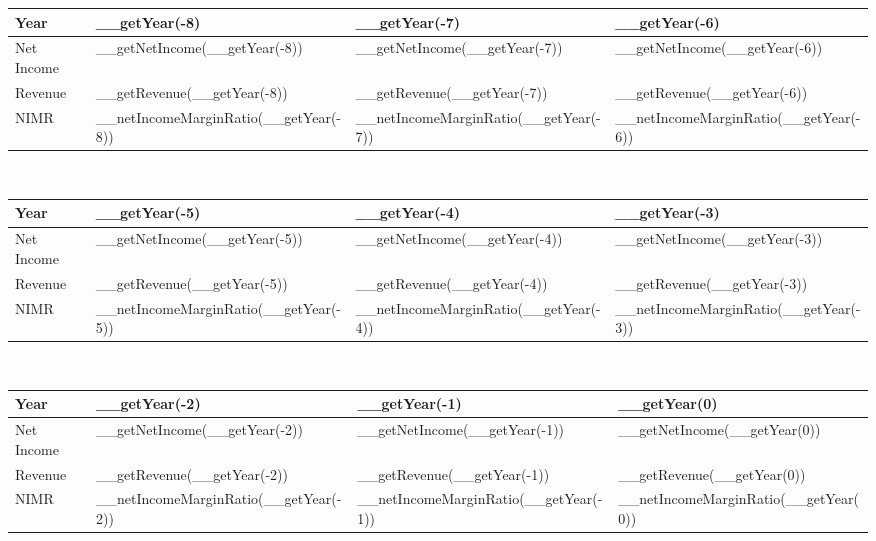 \begin{tabularx}{\textwidth}{|X|X|X|X|}
 \hline
 Year                       & __getYear(-8)                         & __getYear(-7)                         & __getYear(-6)                         \\
 \hline
 Net Income                 & __getNetIncome(__getYear(-8))         & __getNetIncome(__getYear(-7))         & __getNetIncome(__getYear(-6))         \\
 Revenue                    & __getRevenue(__getYear(-8))           & __getRevenue(__getYear(-7))           & __getRevenue(__getYear(-6))           \\
 \rowcolor{lightgray} NIMR  & __netIncomeMarginRatio(__getYear(-8)) & __netIncomeMarginRatio(__getYear(-7)) & __netIncomeMarginRatio(__getYear(-6)) \\
 \hline
\end{tabularx}\\

\begin{tabularx}{\textwidth}{|X|X|X|X|}
 \hline
 Year                       & __getYear(-5)                         & __getYear(-4)                         & __getYear(-3)                         \\
 \hline
 Net Income                 & __getNetIncome(__getYear(-5))         & __getNetIncome(__getYear(-4))         & __getNetIncome(__getYear(-3))         \\
 Revenue                    & __getRevenue(__getYear(-5))           & __getRevenue(__getYear(-4))           & __getRevenue(__getYear(-3))           \\
 \rowcolor{lightgray} NIMR  & __netIncomeMarginRatio(__getYear(-5)) & __netIncomeMarginRatio(__getYear(-4)) & __netIncomeMarginRatio(__getYear(-3)) \\
 \hline
\end{tabularx}\\

\begin{tabularx}{\textwidth}{|X|X|X|X|}
 \hline
 Year                       & __getYear(-2)                         & __getYear(-1)                         & __getYear(0)                         \\
 \hline
 Net Income                 & __getNetIncome(__getYear(-2))         & __getNetIncome(__getYear(-1))         & __getNetIncome(__getYear(0))         \\
 Revenue                    & __getRevenue(__getYear(-2))           & __getRevenue(__getYear(-1))           & __getRevenue(__getYear(0))           \\
 \rowcolor{lightgray} NIMR  & __netIncomeMarginRatio(__getYear(-2)) & __netIncomeMarginRatio(__getYear(-1)) & __netIncomeMarginRatio(__getYear(0)) \\
 \hline
\end{tabularx}

